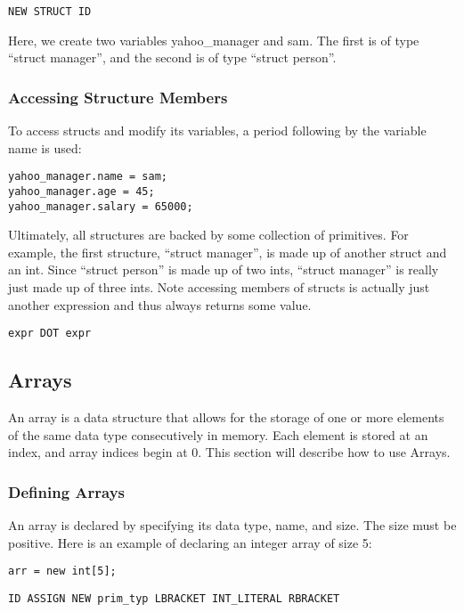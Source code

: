 \documentclass{article}
\begin{document}
\begin{Verbatim}[frame=single]
NEW STRUCT ID 
\end{Verbatim}

Here, we create two variables yahoo\_manager and sam. The first is of type ``struct manager'', and the second is of type ``struct person''.

\subsubsection{Accessing Structure Members}

 To access structs and modify its variables, a period following by the variable name is used:

 \begin{lstlisting}
yahoo_manager.name = sam;
yahoo_manager.age = 45;
yahoo_manager.salary = 65000;
\end{lstlisting}
 Ultimately, all structures are backed by some collection of primitives. For example, the first structure, ``struct manager'', is made up of another struct and an int. Since ``struct person'' is made up of two ints, ``struct manager'' is really just made up of three ints. Note accessing members of structs is actually just another expression and thus always returns some value.
 
 
\begin{Verbatim}[frame=single]
expr DOT expr 
\end{Verbatim}


\subsection{Arrays}
An array is a data structure that allows for the storage of one or more elements of the same data type consecutively in memory. Each element is stored at an index, and array indices begin at 0. This section will describe how to use Arrays.

\subsubsection{Defining Arrays}
An array is declared by specifying its data type, name, and size. The size must be positive. Here is an example of declaring an integer array of size 5:

 \begin{lstlisting}
arr = new int[5];
\end{lstlisting}

\begin{Verbatim}[frame=single]
ID ASSIGN NEW prim_typ LBRACKET INT_LITERAL RBRACKET
\end{Verbatim}
\end{document}
